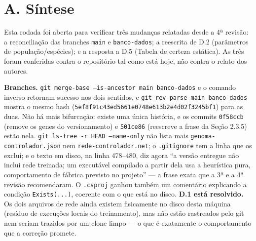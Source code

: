 \documentclass[11pt,a4paper]{article}
\begin{document}
\vspace{0.5em}

\section*{A. Síntese}

Esta rodada foi aberta para verificar três mudanças relatadas desde a 4ª revisão: a reconciliação das
branches \texttt{main} e \texttt{banco-dados}; a reescrita de D.2 (parâmetros de população/espécies);
e a resposta a D.5 (Tabela de certeza estática). As três foram conferidas contra o repositório tal
como está hoje, não contra o relato dos autores.

\textbf{Branches.} \texttt{git merge-base --is-ancestor main banco-dados} e o comando inverso
retornam sucesso nos dois sentidos, e \texttt{git rev-parse main banco-dados} mostra o mesmo hash
(\texttt{5ef8f91c43ed5661e0748e613b2e4d02f3245bf1}) para as duas. Não há mais bifurcação: existe uma
única história, e os commits \texttt{0f58ccb} (remove os genes do versionamento) e \texttt{501ce86}
(reescreve a frase da Seção 2.3.5) estão nela. \texttt{git ls-tree -r HEAD --name-only} não lista mais
\texttt{genoma-controlador.json} nem \texttt{rede-controlador.net}; o \texttt{.gitignore} tem a linha
que os exclui; e o texto em disco, na linha 478--480, diz agora ``a versão entregue não inclui rede
treinada; um executável compilado a partir dela usa a heurística pura, comportamento de fábrica
previsto no projeto'' --- a frase exata que a 3ª e a 4ª revisão recomendaram. O \texttt{.csproj} ganhou
também um comentário explicando a condição \texttt{Exists(...)}, coerente com o que está no disco.
\textbf{D.1 está resolvido.} Os dois arquivos de rede ainda existem fisicamente no disco desta máquina
(resíduo de execuções locais do treinamento), mas não estão rastreados pelo git nem seriam trazidos por
um clone limpo --- o que é exatamente o comportamento que a correção promete.
\end{document}
